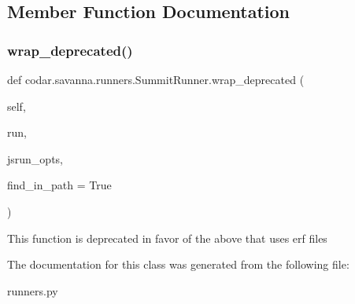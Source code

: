 \subsection{Member Function Documentation}
\mbox{\label{classcodar_1_1savanna_1_1runners_1_1_summit_runner_a79042d5ab820ce5cc55292e2c3338994}} 
\subsubsection{\texorpdfstring{wrap\+\_\+deprecated()}{wrap\_deprecated()}}
{\footnotesize\ttfamily def codar.\+savanna.\+runners.\+Summit\+Runner.\+wrap\+\_\+deprecated (\begin{DoxyParamCaption}\item[{}]{self,  }\item[{}]{run,  }\item[{}]{jsrun\+\_\+opts,  }\item[{}]{find\+\_\+in\+\_\+path = {\ttfamily True} }\end{DoxyParamCaption})}

\begin{DoxyVerb}This function is deprecated in favor of the above that uses erf
files\end{DoxyVerb}
 

The documentation for this class was generated from the following file\+:\begin{DoxyCompactItemize}
\item 
runners.\+py\end{DoxyCompactItemize}
